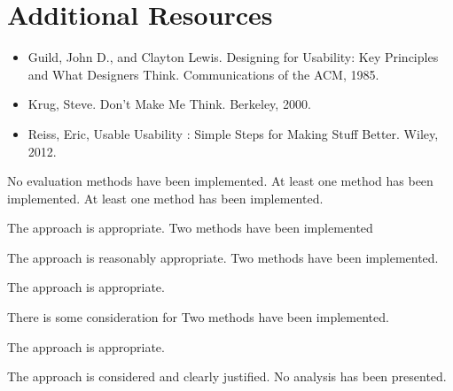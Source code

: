 \documentclass{../fal_assignment}
\begin{document}
\section*{Additional Resources}
\begin{itemize}
    \item Guild, John D., and Clayton Lewis. Designing for Usability: Key Principles and What Designers Think. Communications of the ACM, 1985.
    \item Krug, Steve. Don't Make Me Think. Berkeley, 2000. 
    \item Reiss, Eric, Usable Usability : Simple Steps for Making Stuff Better. Wiley, 2012.
\end{itemize}

\rubricyeartwo

\begin{markingrubric}
        \grade\fail 	No evaluation methods have been implemented.
        \grade 		At least one method has been implemented.
        \grade 		At least one method has been implemented.
        \par		The approach is appropriate. 
        \grade 		Two methods have been implemented 
        \par		The approach is reasonably appropriate.
        \grade 		Two methods have been implemented.
        \par		The approach is appropriate.
        \par 		There is some consideration for 
        \grade 		Two methods have been implemented.
        \par		The approach is appropriate.
        \par		The approach is considered and clearly justified.
        \grade\fail 	No analysis has been presented.
        

\end{markingrubric}
\end{document}
